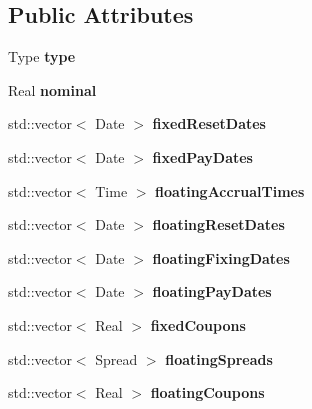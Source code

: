 \subsection*{Public Attributes}
\begin{DoxyCompactItemize}
\item 
Type {\bfseries type}\label{class_quant_lib_1_1_vanilla_swap_1_1arguments_a5a4c8f82fb9c10d8d97d3157096c3794}

\item 
Real {\bfseries nominal}\label{class_quant_lib_1_1_vanilla_swap_1_1arguments_a6b428d7e44918f1aa0d119349cefb211}

\item 
std\+::vector$<$ Date $>$ {\bfseries fixed\+Reset\+Dates}\label{class_quant_lib_1_1_vanilla_swap_1_1arguments_a1c3ce63d6a267bb996f36299b931fbb4}

\item 
std\+::vector$<$ Date $>$ {\bfseries fixed\+Pay\+Dates}\label{class_quant_lib_1_1_vanilla_swap_1_1arguments_a0a6133e012295d18cea2c4ec5ebcae21}

\item 
std\+::vector$<$ Time $>$ {\bfseries floating\+Accrual\+Times}\label{class_quant_lib_1_1_vanilla_swap_1_1arguments_ac9dcdc8d9de924f762f4bfe716aeced2}

\item 
std\+::vector$<$ Date $>$ {\bfseries floating\+Reset\+Dates}\label{class_quant_lib_1_1_vanilla_swap_1_1arguments_a8eda290c17bc4b3aa5486a8069beb8e9}

\item 
std\+::vector$<$ Date $>$ {\bfseries floating\+Fixing\+Dates}\label{class_quant_lib_1_1_vanilla_swap_1_1arguments_a62e2fff9c2a861a38659d780f6ac4fa8}

\item 
std\+::vector$<$ Date $>$ {\bfseries floating\+Pay\+Dates}\label{class_quant_lib_1_1_vanilla_swap_1_1arguments_aa7176d8251ec0a25a2fcffd41a20c367}

\item 
std\+::vector$<$ Real $>$ {\bfseries fixed\+Coupons}\label{class_quant_lib_1_1_vanilla_swap_1_1arguments_a88ecae3f78b527ae7088c0ac8eaf176e}

\item 
std\+::vector$<$ Spread $>$ {\bfseries floating\+Spreads}\label{class_quant_lib_1_1_vanilla_swap_1_1arguments_a78d4a357809914cca988ffdd20410a3e}

\item 
std\+::vector$<$ Real $>$ {\bfseries floating\+Coupons}\label{class_quant_lib_1_1_vanilla_swap_1_1arguments_af07e648622af0c953a2c66d480e140c7}

\end{DoxyCompactItemize}


